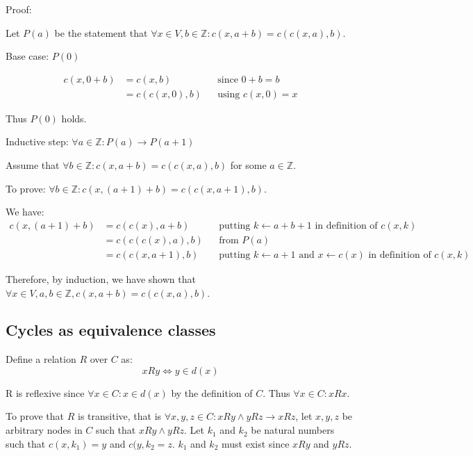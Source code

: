 \documentclass[11pt]{article}
\begin{document}
    Proof:

    Let $P(a)$ be the statement that $\forall x \in V, b \in \mathbb{Z}:c(x, a+b) = c(c(x,a),b)$.

    Base case: $P(0)$

    \begin{align*}
        \text{$c(x,0+b)$} &= \text{$c(x,b)$} && \text{since $0+b = b$} \\
        &= \text{$c(c(x,0),b)$} && \text{using $c(x,0) = x$}
    \end{align*}


    Thus $P(0)$ holds.

    Inductive step: $\forall a \in \mathbb{Z}: P(a) \rightarrow P(a+1)$

    Assume that $\forall b \in \mathbb{Z}:c(x, a+b) = c(c(x,a),b)$ for some $a \in \mathbb{Z}$.

    To prove:  $\forall b \in \mathbb{Z}: c(x, (a+1)+b) = c(c(x,a+1),b)$.

    We have:
    \begin{align*}
        \text{$c(x,(a+1)+b)$} &= \text{$c(c(x),a+b)$} && \text{putting $k \leftarrow a+b+1$ in definition of $c(x,k)$} \\
        &= \text{$c(c(c(x),a),b)$} && \text{from $P(a)$} \\
        &= \text{$c(c(x,a+1),b)$} && \text{putting $k \leftarrow a+1$ and $x \leftarrow c(x)$ in definition of $c(x,k)$}
    \end{align*}

    Therefore, by induction, we have shown that $\forall x \in V, a,b \in \mathbb{Z}, c(x, a+b) = c(c(x,a),b)$.





    \subsection{Cycles as equivalence classes}

    Define a relation $R$ over $C$ as:
    \begin{equation}
        xRy \Leftrightarrow y \in d(x)
        \label{define_R}
    \end{equation}

    R is reflexive since $\forall x \in C: x\in d(x)$ by the definition of $C$. Thus $\forall x \in C: xRx$.

    To prove that $R$ is transitive, that is $\forall x,y,z \in C: xRy \land yRz \rightarrow xRz$, let $x,y,z$ be arbitrary nodes in $C$ such that $xRy \land yRz$. Let $k_{1}$ and $k_{2}$ be natural numbers such that $c(x,k_{1})=y$ and $c(y,k_{2}=z$. $k_{1}$ and $k_{2}$ must exist since $xRy$ and $yRz$.
\end{document}
